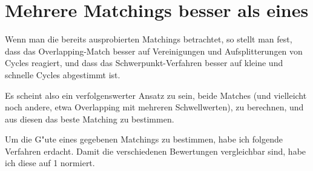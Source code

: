 \section{Mehrere Matchings besser als eines}

Wenn man die bereits ausprobierten Matchings betrachtet, so stellt man fest, dass das Overlapping-Match besser auf Vereinigungen und Aufsplitterungen von Cycles reagiert, und dass das Schwerpunkt-Verfahren besser auf kleine und schnelle Cycles abgestimmt ist. 

Es scheint also ein verfolgenswerter Ansatz zu sein, beide Matches (und vielleicht noch andere, etwa Overlapping mit mehreren Schwellwerten), zu berechnen, und aus diesen das beste Matching zu bestimmen. 

Um die G"ute eines gegebenen Matchings zu bestimmen, habe ich folgende Verfahren erdacht. Damit die verschiedenen Bewertungen vergleichbar sind, habe ich diese auf 1 normiert.
